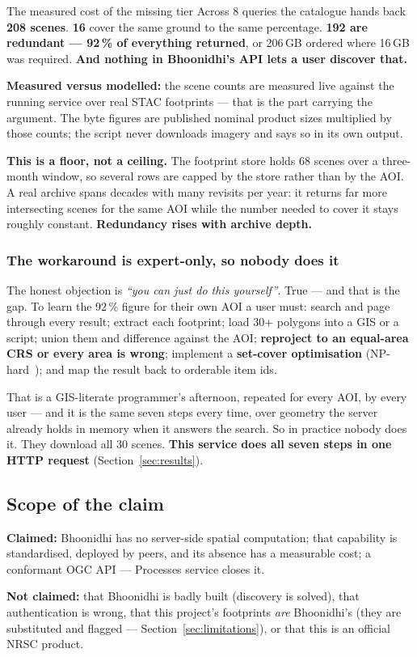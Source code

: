 \begin{keyfinding}{The measured cost of the missing tier}
Across 8 queries the catalogue hands back \textbf{208 scenes}. \textbf{16} cover
the same ground to the same percentage. \textbf{192 are redundant --- 92\,\% of
everything returned}, or 206\,GB ordered where 16\,GB was required.
\textbf{And nothing in Bhoonidhi's API lets a user discover that.}
\end{keyfinding}

\textbf{Measured versus modelled:} the scene counts are measured live against
the running service over real STAC footprints --- that is the part carrying the
argument. The byte figures are published nominal product sizes multiplied by
those counts; the script never downloads imagery and says so in its own output.

\textbf{This is a floor, not a ceiling.} The footprint store holds 68 scenes
over a three-month window, so several rows are capped by the store rather than
by the AOI. A real archive spans decades with many revisits per year: it returns
far more intersecting scenes for the same AOI while the number needed to cover
it stays roughly constant. \textbf{Redundancy rises with archive depth.}

\subsubsection{The workaround is expert-only, so nobody does it}

The honest objection is \emph{``you can just do this yourself''}. True --- and
that is the gap. To learn the 92\,\% figure for their own AOI a user must:
search and page through every result; extract each footprint; load 30+ polygons
into a GIS or a  script; union them and difference against the
AOI; \textbf{reproject to an equal-area CRS or every area is wrong}; implement a
\textbf{set-cover optimisation} (NP-hard~\cite{setcover}); and map the result
back to orderable item ids.

That is a GIS-literate programmer's afternoon, repeated for every AOI, by every
user --- and it is the same seven steps every time, over geometry the server
already holds in memory when it answers the search. So in practice nobody does
it. They download all 30 scenes. \textbf{This service does all seven steps in
one HTTP request} (Section~\ref{sec:results}).

\subsection{Scope of the claim}

\textbf{Claimed:} Bhoonidhi has no server-side spatial computation; that
capability is standardised, deployed by peers, and its absence has a measurable
cost; a conformant OGC API --- Processes service closes it.

\textbf{Not claimed:} that Bhoonidhi is badly built (discovery is solved), that
authentication is wrong, that this project's footprints \emph{are} Bhoonidhi's
(they are substituted and flagged --- Section~\ref{sec:limitations}), or that
this is an official NRSC product.
